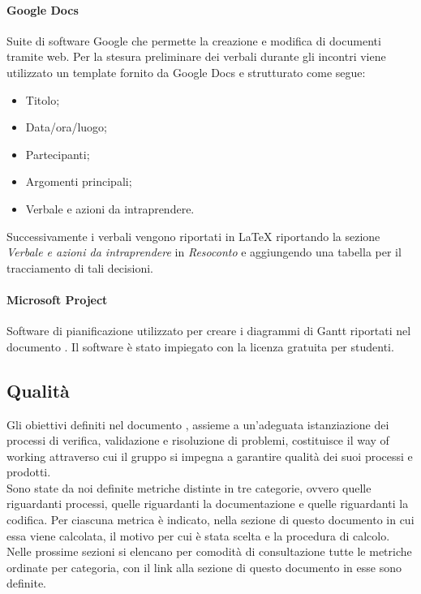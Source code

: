 \paragraph{Google Docs}
Suite di software Google che permette la creazione e modifica di documenti tramite web. Per la stesura preliminare dei verbali durante gli incontri viene utilizzato un template fornito da Google Docs e strutturato come segue:
\begin{itemize}
	\item Titolo;
	\item Data/ora/luogo;
	\item Partecipanti;
	\item Argomenti principali;
	\item Verbale e azioni da intraprendere.
\end{itemize}

Successivamente i verbali vengono riportati in \LaTeX{} riportando la sezione \textit{Verbale e azioni da intraprendere} in \textit{Resoconto} e aggiungendo una tabella per il tracciamento di tali decisioni.

\paragraph{Microsoft Project}
Software di pianificazione utilizzato per creare i diagrammi di Gantt riportati nel documento \docNameVersionPdP{}. Il software è stato impiegato con la licenza gratuita per studenti.

\subsection{Qualità}\label{subsection:qualita}

Gli obiettivi definiti nel documento \docNameVersionPdQ{}, assieme a un'adeguata istanziazione dei processi di verifica, validazione e risoluzione di problemi, costituisce il way of working attraverso cui il gruppo \groupName{} si impegna a garantire qualità dei suoi processi e prodotti.\\ Sono state da noi definite metriche distinte in tre categorie, ovvero quelle riguardanti processi, quelle riguardanti la documentazione e quelle riguardanti la codifica. Per ciascuna metrica è indicato, nella sezione di questo documento in cui essa viene calcolata, il motivo per cui è stata scelta e la procedura di calcolo.\\
Nelle prossime sezioni si elencano per comodità di consultazione tutte le metriche ordinate per categoria, con il link alla sezione di questo documento in esse sono definite.

